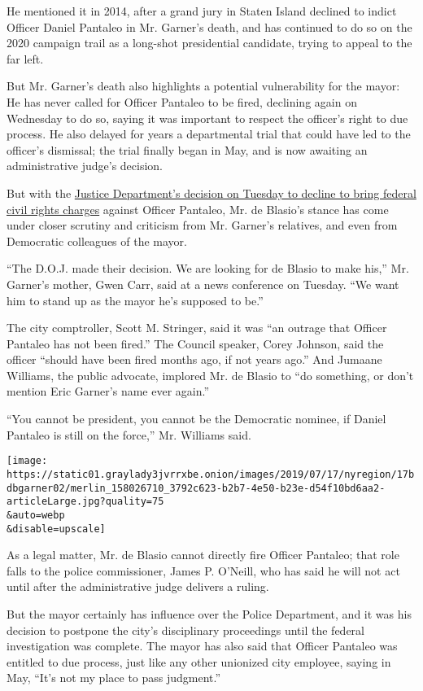 He mentioned it in 2014, after a grand jury in Staten Island declined to
indict Officer Daniel Pantaleo in Mr. Garner's death, and has continued
to do so on the 2020 campaign trail as a long-shot presidential
candidate, trying to appeal to the far left.

But Mr. Garner's death also highlights a potential vulnerability for the
mayor: He has never called for Officer Pantaleo to be fired, declining
again on Wednesday to do so, saying it was important to respect the
officer's right to due process. He also delayed for years a departmental
trial that could have led to the officer's dismissal; the trial finally
began in May, and is now awaiting an administrative judge's decision.

But with the
\href{https://www.nytimes3xbfgragh.onion/2019/07/16/nyregion/eric-garner-case-death-daniel-pantaleo.html}{Justice
Department's decision on Tuesday to decline to bring federal civil
rights charges} against Officer Pantaleo, Mr. de Blasio's stance has
come under closer scrutiny and criticism from Mr. Garner's relatives,
and even from Democratic colleagues of the mayor.

``The D.O.J. made their decision. We are looking for de Blasio to make
his,'' Mr. Garner's mother, Gwen Carr, said at a news conference on
Tuesday. ``We want him to stand up as the mayor he's supposed to be.''

The city comptroller, Scott M. Stringer, said it was ``an outrage that
Officer Pantaleo has not been fired.'' The Council speaker, Corey
Johnson, said the officer ``should have been fired months ago, if not
years ago.'' And Jumaane Williams, the public advocate, implored Mr. de
Blasio to ``do something, or don't mention Eric Garner's name ever
again.''

``You cannot be president, you cannot be the Democratic nominee, if
Daniel Pantaleo is still on the force,'' Mr. Williams said.

\texttt{[image: https://static01.graylady3jvrrxbe.onion/images/2019/07/17/nyregion/17bdbgarner02/merlin\_158026710\_3792c623-b2b7-4e50-b23e-d54f10bd6aa2-articleLarge.jpg?quality=75\\\&auto=webp\\\&disable=upscale]}

As a legal matter, Mr. de Blasio cannot directly fire Officer Pantaleo;
that role falls to the police commissioner, James P. O'Neill, who has
said he will not act until after the administrative judge delivers a
ruling.

But the mayor certainly has influence over the Police Department, and it
was his decision to postpone the city's disciplinary proceedings until
the federal investigation was complete. The mayor has also said that
Officer Pantaleo was entitled to due process, just like any other
unionized city employee, saying in May, ``It's not my place to pass
judgment.''

